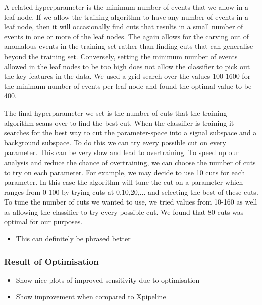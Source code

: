 \documentclass[11pt]{cuthesis}
\begin{document}
A related hyperparameter is the minimum number of events that we allow in a leaf node. If we allow the training algorithm to have any number of events in a leaf node, then it will occasionally find cuts that results in a small number of events in one or more of the leaf nodes. The again allows for the carving out of anomalous events in the training set rather than finding cuts that can generalise beyond the training set. Conversely, setting the minimum number of events allowed in the leaf nodes to be too high does not allow the classifier to pick out the key features in the data. We used a grid search over the values 100-1600 for the minimum number of events per leaf node and found the optimal value to be 400. 

The final hyperparameter we set is the number of cuts that the training algorithm scans over to find the best cut. When the classifier is training it searches for the best way to cut the parameter-space into a signal subspace and a background subspace. To do this we can try every possible cut on every parameter. This can be very slow and lead to overtraining. To speed up our analysis and reduce the chance of overtraining, we can choose the number of cuts to try on each parameter. For example, we may decide to use 10 cuts for each parameter. In this case the algorithm will tune the cut on a parameter which ranges from 0-100 by trying cuts at 0,10,20,... and selecting the best of these cuts. To tune the number of cuts we wanted to use, we tried values from 10-160 as well as allowing the classifier to try every possible cut. We found that 80 cuts was optimal for our purposes. 

\begin{itemize}
\item This can definitely be phrased better
\end{itemize}

\subsubsection{Result of Optimisation}
\begin{itemize}
\item Show nice plots of improved sensitivity due to optimisation
\item Show improvement when compared to Xpipeline
\end{itemize}



\backmatter
\end{document}
